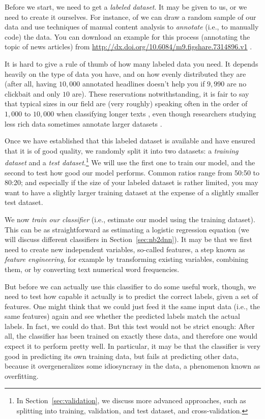 Before we start, we need to get a \emph{labeled dataset}.
It may be given to us, or we need to create it ourselves.
For instance, of we can draw a random sample of our data and use techniques
of manual content analysis \citep[e.g.,][]{riffe2019analyzing} to
\emph{annotate} (i.e., to manually code) the data.
You can download an example for this process (annotating the topic of news
articles) from \url{http://dx.doi.org/10.6084/m9.figshare.7314896.v1} \citep{Vermeer2018}.

It is hard to give a rule of thumb of how many labeled data you need.
It depends heavily on the type of data you have, and on how evenly distributed
they are (after all, having $10,000$ annotated headlines doesn't help you if
$9,990$ are no clickbait and only $10$ are).
These reservations notwithstanding, it is fair to say that typical sizes in
our field are (very roughly) speaking often in the order of $1,000$ to $10,000$
when classifying longer texts \citep[see, for instance,][]{burscher2014teaching},
even though researchers studying less rich data sometimes annotate larger
datasets \citep[e.g., $60,000$ social media messages in][]{vermeer2019seeing}.

Once we have established that this labeled dataset is available and have
ensured that it is of good quality, we randomly split it into two datasets:
a \emph{training dataset} and a \emph{test dataset}.\footnote{In
  Section~\ref{sec:validation}, we discuss more advanced approaches, such
  as splitting into training, validation, and test dataset, and cross-validation.}
We will use the first one to train our model, and the second to test how
good our model performs. Common ratios range from 50:50 to 80:20; and especially
if the size of your labeled dataset is rather limited, you may want to have
a slightly larger training dataset at the expense of a slightly smaller test
dataset.

We now \emph{train our classifier} (i.e., estimate our model using the
training dataset). This can be as straightforward as estimating a logistic
regression equation (we will discuss different classifiers in
Section~\ref{sec:nb2dnn}).
It may be that we first need to create new independent variables, so-called
features, a step known as \emph{feature engineering}, for example by transforming
existing variables, combining them, or by converting text numerical word frequencies.

But before we can actually use this classifier to do some useful work, though,
we need to test how capable it actually is to predict the correct labels,
given a set of features. One might think that we could just feed it the same
input data (i.e., the same features) again and see whether the predicted labels
match the actual labels.
In fact, we could do that.
But this test would not be strict enough:
After all, the classifier has been trained on exactly these data, and therefore
one would expect it to perform pretty well.
In particular, it may be that the classifier is very good in predicting its
own training data, but fails at predicting other data, because it overgeneralizes
some idiosyncrasy in the data, a phenomenon known as overfitting.

